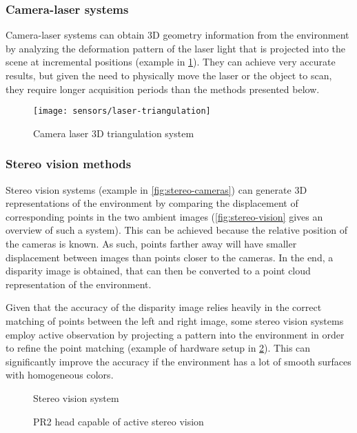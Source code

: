 \subsubsection{Camera-laser systems}

Camera-laser systems can obtain 3D geometry information from the environment by analyzing the deformation pattern of the laser light that is projected into the scene at incremental positions (example in \cref{fig:laser-triangulation}). They can achieve very accurate results, but given the need to physically move the laser or the object to scan, they require longer acquisition periods than the methods presented below.

\begin{figure}[H]
	\centering
	\texttt{[image: sensors/laser-triangulation]}
	\caption[Camera laser 3D triangulation system]{Camera laser 3D triangulation system\protect\footnotemark}
	\label{fig:laser-triangulation}
\end{figure}


\subsubsection{Stereo vision methods}

Stereo vision systems (example in \cref{fig:stereo-cameras}) can generate 3D representations of the environment by comparing the displacement of corresponding points in the two ambient images (\cref{fig:stereo-vision} gives an overview of such a system). This can be achieved because the relative position of the cameras is known. As such, points farther away will have smaller displacement between images than points closer to the cameras. In the end, a disparity image is obtained, that can then be converted to a point cloud representation of the environment.

Given that the accuracy of the disparity image relies heavily in the correct matching of points between the left and right image, some stereo vision systems employ active observation by projecting a pattern into the environment in order to refine the point matching (example of hardware setup in \cref{fig:pr2-active-stereo}). This can significantly improve the accuracy if the environment has a lot of smooth surfaces with homogeneous colors.

\begin{figure}[H]
	\begin{floatrow}[2]
		{\caption[Stereo vision system]{Stereo vision system \cite{Kaczurba2013}}\label{fig:stereo-cameras}}

		{\caption[PR2 head capable of active stereo vision]{PR2 head capable of active stereo vision\protect\footnotemark}\label{fig:pr2-active-stereo}}
	\end{floatrow}
\end{figure}


